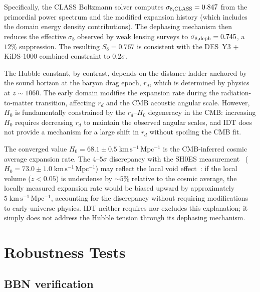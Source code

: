 \documentclass[aps,prd,twocolumn,superscriptaddress,nofootinbib]{revtex4-2}
\newcommand{\Hubble}{H_0}
\begin{document}
Specifically, the CLASS Boltzmann solver computes $\sigma_{8,\rm
CLASS} = 0.847$ from the primordial power spectrum and the modified
expansion history (which includes the domain energy density
contributions). The dephasing mechanism then reduces the effective
$\sigma_8$ observed by weak lensing surveys to $\sigma_{8,\rm
deph} = 0.745$, a $12\%$ suppression. The resulting $S_8 = 0.767$ is
consistent with the DES~Y3 + KiDS-1000 combined constraint to
$0.2\sigma$.

The Hubble constant, by contrast, depends on the distance ladder
anchored by the sound horizon at the baryon drag epoch, $r_d$, which
is determined by physics at $z \sim 1060$. The early domain modifies
the expansion rate during the radiation-to-matter transition,
affecting $r_d$ and the CMB acoustic angular scale. However, $\Hubble$
is fundamentally constrained by the $r_d$--$\Hubble$ degeneracy in the
CMB: increasing $\Hubble$ requires decreasing $r_d$ to maintain the
observed angular scales, and IDT does not provide a mechanism for a
large shift in $r_d$ without spoiling the CMB fit.

The converged value $\Hubble = 68.1 \pm
0.5\;\mathrm{km\,s^{-1}\,Mpc^{-1}}$ is the CMB-inferred cosmic
average expansion rate. The $4$--$5\sigma$ discrepancy with the
SH0ES measurement~\cite{Riess2022} ($\Hubble = 73.0 \pm
1.0\;\mathrm{km\,s^{-1}\,Mpc^{-1}}$) may reflect the local void
effect~\cite{Kenworthy2019,Wojtak2014}: if the local volume
($z < 0.05$) is underdense by $\sim 5\%$ relative to the cosmic
average, the locally measured expansion rate would be biased upward by
approximately $5\;\mathrm{km\,s^{-1}\,Mpc^{-1}}$, accounting for the
discrepancy without requiring modifications to early-universe
physics. IDT neither requires nor excludes this explanation; it simply
does not address the Hubble tension through its dephasing mechanism.

\section{Robustness Tests}
\label{sec:robustness}

\subsection{BBN verification}
\label{sec:bbn}
\end{document}
